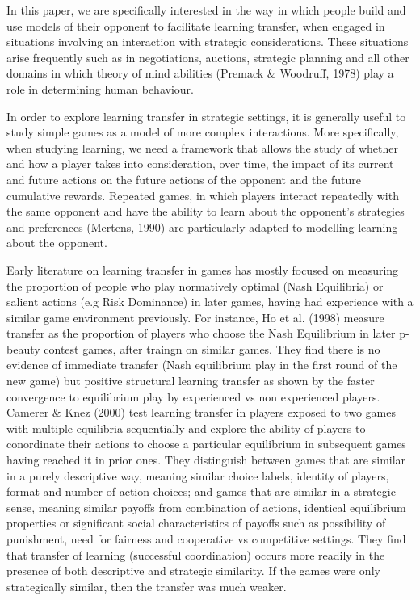\documentclass[12pt]{article}         %
\begin{document}
In this paper, we are specifically interested in the way in which people build and use models of their opponent to facilitate learning transfer, when engaged in situations involving an interaction with strategic considerations. These situations arise frequently such as in negotiations, auctions, strategic planning and all other domains in which theory of mind abilities (Premack & Woodruff, 1978) play a role in determining human behaviour.  

In order to explore learning transfer in strategic settings, it is generally useful to study simple games as a model of more complex interactions. More specifically, when studying learning, we need a framework that allows the study of whether and how a player takes into consideration, over time, the impact of its current and future actions on the future actions of the opponent and the future cumulative rewards. Repeated games, in which players interact repeatedly with the same opponent and have the ability to learn about the opponent's strategies and preferences (Mertens, 1990) are particularly adapted to modelling learning about the opponent.

Early literature on learning transfer in games has mostly focused on measuring the proportion of people who play normatively optimal (Nash Equilibria) or salient actions (e.g Risk Dominance) in later games, having had experience with a similar game environment previously. For instance, Ho et al. (1998) measure transfer as the proportion of players who choose the Nash Equilibrium in later p-beauty contest games, after traingn on similar games. They find there is no evidence of immediate transfer (Nash equilibrium play in the first round of the new game) but positive structural learning transfer as shown by the faster convergence to equilibrium play by experienced vs non experienced players. Camerer & Knez (2000) test learning transfer in players exposed to two games with multiple equilibria sequentially and explore the ability of players to conordinate their actions to choose a particular equilibrium in subsequent games having reached it in prior ones. They distinguish between games that are similar in a purely descriptive way, meaning similar choice labels, identity of players, format and number of action choices; and games that are similar in a strategic sense, meaning similar payoffs from combination of actions, identical equilibrium properties or significant social characteristics of payoffs such as possibility of punishment, need for fairness and cooperative vs competitive settings. They find that transfer of learning (successful coordination) occurs more readily in the presence of both descriptive and strategic similarity. If the games were only strategically similar, then the transfer was much weaker.  
\end{document}
